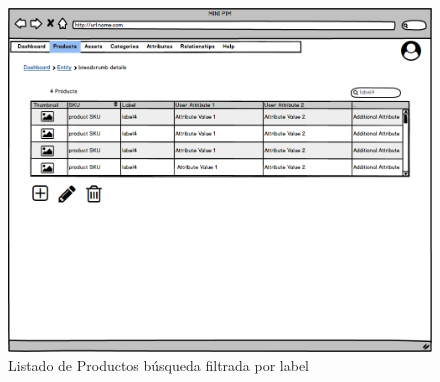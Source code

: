 \begin{figure}[H]
    \includegraphics[width=1\linewidth]{mockups/RF2- Gestión General de Productos (listado por búsqueda).png}
    \caption{Listado de Productos búsqueda filtrada por label}
   \end{figure}
\vspace{1.0cm}

\newpage %